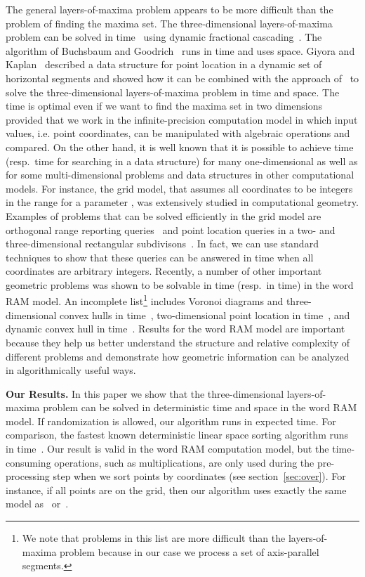 \documentclass[10pt]{llncs}
\begin{document}
The general layers-of-maxima problem appears to be more difficult than 
the problem of finding the maxima set.  
The three-dimensional layers-of-maxima problem can be solved in 
 time~\cite{A92} using dynamic fractional 
cascading~\cite{MN90}. The algorithm  
of Buchsbaum and Goodrich~\cite{BG04} runs in  time 
and uses  space. 
Giyora and Kaplan~\cite{GK09} described a data structure for point 
location in a dynamic set of horizontal segments and showed how  it 
can be  combined with the approach of~\cite{BG04} 
to solve the three-dimensional layers-of-maxima problem 
in  time and  space. 
The  time is optimal even if we want to find the maxima set in 
two dimensions~\cite{KLP75} provided that we work 
in the infinite-precision computation 
model in which  input values, i.e. point coordinates, can be manipulated 
with algebraic operations and compared. 
On the other hand, 
it is well known that it is possible to achieve 
 time (resp.\  time for searching in a data structure) 
for many one-dimensional as well as for some multi-dimensional 
problems and data structures in other computational models. 
For instance, the grid model, that assumes all coordinates to be integers
in the range  for a parameter , was extensively studied in
 computational geometry. Examples of problems that can be solved efficiently 
in the grid model are orthogonal range reporting queries~\cite{O88} 
and point location queries 
in a  two- and three-dimensional rectangular subdivisons~\cite{BKS95}.
In fact, we can use standard techniques 
to show that these  queries can be answered in  time when all 
coordinates are arbitrary integers. 
Recently, a number of other important geometric problems was shown to be 
solvable 
in  time (resp.\ in  time) in the word RAM model.
An incomplete list\footnote{We note that problems in this list are 
more difficult than the layers-of-maxima problem 
because in our case we process a set of 
axis-parallel segments.} includes Voronoi diagrams and three-dimensional convex 
hulls in  time~\cite{CP07}, 
two-dimensional point location in  
time~\cite{P06,C06}, and dynamic convex 
hull in  time~\cite{DP07}. 
Results for the word RAM model are important because they help us better 
understand 
the structure and relative complexity of different problems and demonstrate 
how geometric information can be analyzed in algorithmically useful ways. 


{\bf Our Results.}
In this paper we show that the three-dimensional layers-of-maxima problem 
can be solved in  deterministic 
time and  space in the word RAM 
model. If randomization is allowed, our algorithm runs in 
 expected time. 
For comparison, the fastest 
known deterministic linear space sorting algorithm runs 
in  time~\cite{H04}. 
Our result is valid in the word 
RAM computation model, but the time-consuming operations, such as 
multiplications,  are only used during the pre-processing step when we sort 
points by coordinates (see section~\ref{sec:over}). For instance, 
if all points are on the  grid, then our algorithm 
uses exactly the same model as~\cite{O88} or~\cite{BKS95}. 
\end{document}

